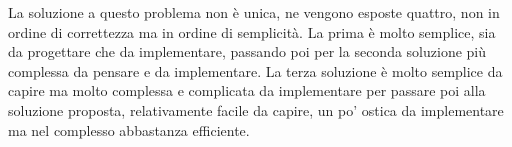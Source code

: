 La soluzione a questo problema non è unica, ne vengono esposte quattro, non in ordine di correttezza ma in ordine di semplicità. La prima è molto semplice, sia da progettare che da implementare, passando poi per la seconda soluzione più complessa da pensare e da implementare. La terza soluzione è molto semplice da capire ma molto complessa e complicata da implementare per passare poi alla soluzione proposta, relativamente facile da capire, un po' ostica da implementare ma nel complesso abbastanza efficiente.